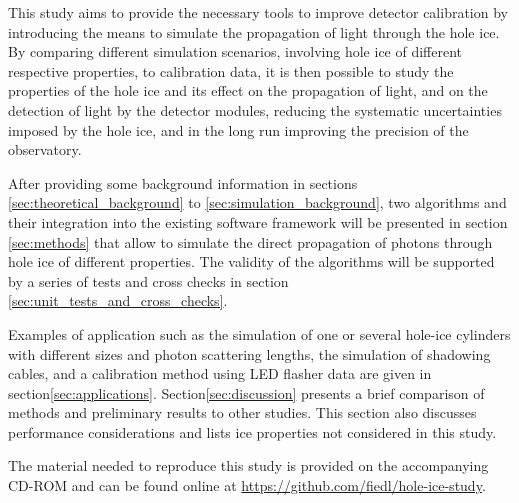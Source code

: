 This study aims to provide the necessary tools to improve detector calibration by introducing the means to simulate the propagation of light through the hole ice. By comparing different simulation scenarios, involving hole ice of different respective properties, to calibration data, it is then possible to study the properties of the hole ice and its effect on the propagation of light, and on the detection of light by the detector modules, reducing the systematic uncertainties imposed by the hole ice, and in the long run improving the precision of the \icecube observatory.

After providing some background information in sections \ref{sec:theoretical_background} to \ref{sec:simulation_background}, two algorithms and their integration into the existing \icecube software framework will be presented in section \ref{sec:methods} that allow to simulate the direct propagation of photons through hole ice of different properties. The validity of the algorithms will be supported by a series of tests and cross checks in section \ref{sec:unit_tests_and_cross_checks}.

Examples of application such as the simulation of one or several hole-ice cylinders with different sizes and photon scattering lengths, the simulation of shadowing cables, and a calibration method using LED flasher data are given in section\nbsp\ref{sec:applications}. Section\nbsp\ref{sec:discussion} presents a brief comparison of methods and preliminary results to other studies. This section also discusses performance considerations and lists ice properties not considered in this study.

The material needed to reproduce this study is provided on the accompanying CD-ROM and can be found online at \url{https://github.com/fiedl/hole-ice-study}.

